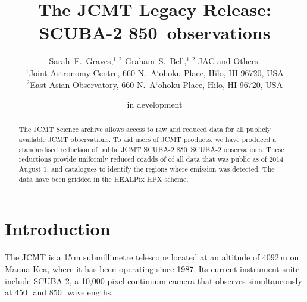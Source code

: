 \documentclass[usenatbib]{mn2e}
\title[SCUBA-2 850\um\ Legacy Release]%
{The JCMT Legacy Release: SCUBA-2 850\bmicron\ observations}
\author[S.~F.~Graves et~al.]
{Sarah~F.~Graves,$^{1,2}$
Graham~S.~Bell,$^{1,2}$
JAC
and
Others.\\
$^1$Joint Astronomy Centre, 660 N.\ A`oh\=ok\=u Place, Hilo, HI 96720, USA\\
$^2$East Asian Observatory, 660 N.\ A`oh\=ok\=u Place, Hilo, HI 96720, USA
}
\newcommand{\um}{\micron}
\begin{document}
\date{in development}

\pagerange{\pageref{firstpage}--\pageref{lastpage}} 

\maketitle

\label{firstpage}

\begin{abstract}
  The JCMT Science archive allows access to raw and reduced data for
  all publicly available JCMT observations. To aid users of JCMT
  products, we have produced a standardised reduction of public JCMT
  SCUBA-2 850\um\ SCUBA-2 observations. These reductions provide
  uniformly reduced coadds of of all data that was public as of 2014 August
  1, and catalogues to identify the regions where emission was
  detected. The data have been gridded in the HEALPix HPX scheme.
\end{abstract}

\section{Introduction}

The JCMT is a 15\,m submillimetre telescope located at an altitude of
4092\,m on Mauna Kea, where it has been operating since
1987. Its current instrument suite include SCUBA-2, a 10,000
pixel continuum camera that observes simultaneously at 450\,\um\ and
850\,\um\ wavelengths\citep{Holland2013}.
\end{document}
